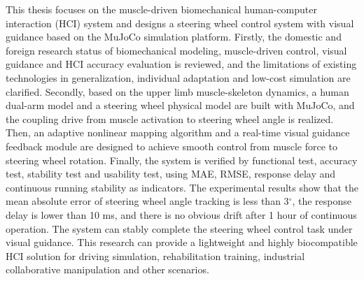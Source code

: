 \begin{abstracten}

This thesis focuses on the muscle-driven biomechanical human-computer interaction (HCI) system and designs a steering wheel control system with visual guidance based on the MuJoCo simulation platform. Firstly, the domestic and foreign research status of biomechanical modeling, muscle-driven control, visual guidance and HCI accuracy evaluation is reviewed, and the limitations of existing technologies in generalization, individual adaptation and low-cost simulation are clarified. Secondly, based on the upper limb muscle-skeleton dynamics, a human dual-arm model and a steering wheel physical model are built with MuJoCo, and the coupling drive from muscle activation to steering wheel angle is realized. Then, an adaptive nonlinear mapping algorithm and a real-time visual guidance feedback module are designed to achieve smooth control from muscle force to steering wheel rotation. Finally, the system is verified by functional test, accuracy test, stability test and usability test, using MAE, RMSE, response delay and continuous running stability as indicators. The experimental results show that the mean absolute error of steering wheel angle tracking is less than 3$^\circ$, the response delay is lower than 10 ms, and there is no obvious drift after 1 hour of continuous operation. The system can stably complete the steering wheel control task under visual guidance. This research can provide a lightweight and highly biocompatible HCI solution for driving simulation, rehabilitation training, industrial collaborative manipulation and other scenarios.

\end{abstracten}